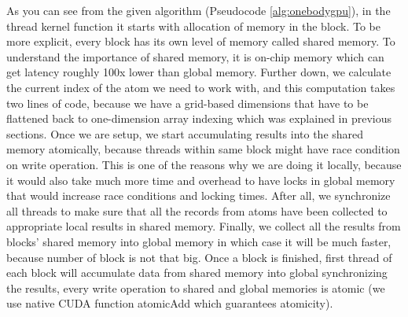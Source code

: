 \documentclass[12pt,letterpaper]{report}
\begin{document}
As you can see from the given algorithm (Pseudocode \ref{alg:onebodygpu}), in the thread kernel function it starts with allocation of memory in the block. To be more explicit, every block has its own level of memory called shared memory. To understand the importance of shared memory, it is on-chip memory which can get latency roughly 100x lower than global memory. Further down, we calculate the current index of the atom we need to work with, and this computation takes two lines of code, because we have a grid-based dimensions that have to be flattened back to one-dimension array indexing which was explained in previous sections. Once we are setup, we start accumulating results into the shared memory atomically, because threads within same block might have race condition on write operation. This is one of the reasons why we are doing it locally, because it would also take much more time and overhead to have locks in global memory that would increase race conditions and locking times. After all, we synchronize all threads to make sure that all the records from atoms have been collected to appropriate local results in shared memory. Finally, we collect all the results from blocks' shared memory into global memory in which case it will be much faster, because number of block is not that big. Once a block is finished, first thread of each block will accumulate data from shared memory into global synchronizing the results, every write operation to shared and global memories is atomic (we use native CUDA function atomicAdd which guarantees atomicity). 

\vspace{1cm}
\end{document}

